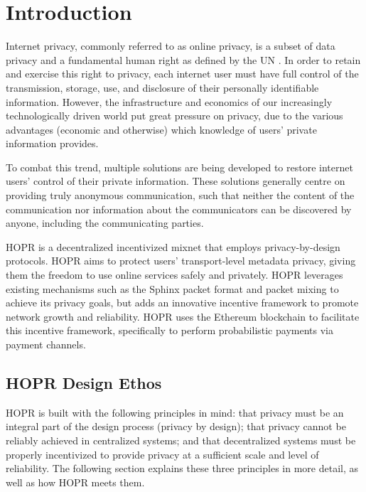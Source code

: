 
\section{Introduction}
\label{sec:introduction}

Internet privacy, commonly referred to as online privacy, is a subset of data privacy and a fundamental human right as defined by the UN \cite{un2018}. In order to retain and exercise this right to privacy, each internet user must have full control of the transmission, storage, use, and disclosure of their personally identifiable information. However, the infrastructure and economics of our increasingly technologically driven world put great pressure on privacy, due to the various advantages (economic and otherwise) which knowledge of users' private information provides.

To combat this trend, multiple solutions are being developed to restore internet users' control of their private information. These solutions generally centre on providing truly anonymous communication, such that neither the content of the communication nor information about the communicators can be discovered by anyone, including the communicating parties.

HOPR is a decentralized incentivized mixnet that employs privacy-by-design protocols. HOPR aims to protect users' transport-level metadata privacy, giving them the freedom to use online services safely and privately. HOPR leverages existing mechanisms such as the Sphinx packet format \cite{sphinxpaper} and packet mixing to achieve its privacy goals, but adds an innovative incentive framework to promote network growth and reliability. HOPR uses the Ethereum blockchain \cite{ethereum} to facilitate this incentive framework, specifically to perform probabilistic payments via payment channels.


\subsection{HOPR Design Ethos}
\label{sec:vision}

HOPR is built with the following principles in mind: that privacy must be an integral part of the design process (privacy by design); that privacy cannot be reliably achieved in centralized systems; and that decentralized systems must be properly incentivized to provide privacy at a sufficient scale and level of reliability. The following section explains these three principles in more detail, as well as how HOPR meets them.

